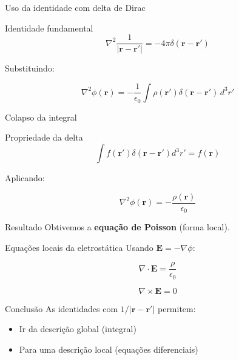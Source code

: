 \documentclass[aspectratio=169]{beamer}
\begin{document}

\begin{frame}{Uso da identidade com delta de Dirac}
\begin{block}{Identidade fundamental}
\begin{equation}
\nabla^2 \frac{1}{|\mathbf{r}-\mathbf{r}'|}
=
-4\pi \delta(\mathbf{r}-\mathbf{r}')
\label{eq:lap_green}
\end{equation}
\end{block}

Substituindo:

\begin{equation}
\nabla^2 \phi(\mathbf{r}) =
-\frac{1}{\epsilon_0}
\int \rho(\mathbf{r}')
\delta(\mathbf{r}-\mathbf{r}')
\, d^3 r'
\end{equation}

\end{frame}


\begin{frame}{Colapso da integral}
\begin{block}{Propriedade da delta}
\begin{equation}
\int f(\mathbf{r}') \delta(\mathbf{r}-\mathbf{r}') d^3 r'
= f(\mathbf{r})
\end{equation}
\end{block}

Aplicando:

\begin{equation}
\nabla^2 \phi(\mathbf{r}) =
-\frac{\rho(\mathbf{r})}{\epsilon_0}
\label{eq:poisson}
\end{equation}

\begin{alertblock}{Resultado}
Obtivemos a \textbf{equação de Poisson} (forma local).
\end{alertblock}

\end{frame}


\begin{frame}{Equações locais da eletrostática}
Usando \(\mathbf{E} = -\nabla \phi\):

\begin{equation}
\nabla \cdot \mathbf{E} = \frac{\rho}{\epsilon_0}
\end{equation}

\begin{equation}
\nabla \times \mathbf{E} = 0
\end{equation}

\begin{block}{Conclusão}
As identidades com \(1/|\mathbf{r}-\mathbf{r}'|\) permitem:
\begin{itemize}
\item Ir da descrição global (integral)
\item Para uma descrição local (equações diferenciais)
\end{itemize}
\end{block}

\end{frame}
\end{document}
